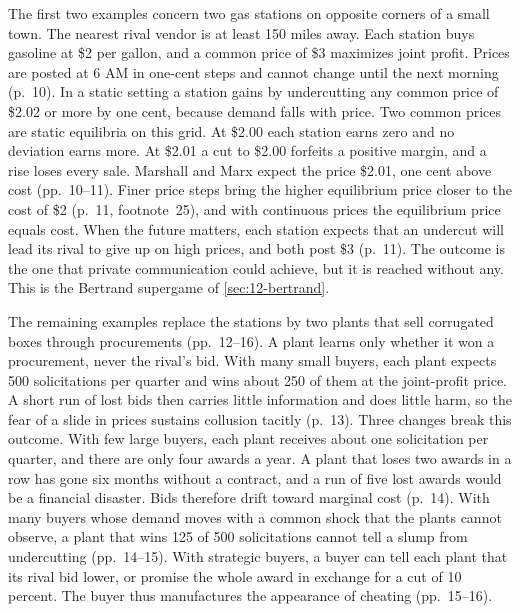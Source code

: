 The first two examples concern two gas stations on opposite corners of a small town. The nearest rival vendor is at least
150 miles away. Each station buys gasoline at \$2 per gallon, and a common price of \$3 maximizes joint profit. Prices are
posted at 6 AM in one-cent steps and cannot change until the next morning (p.~10). In a static setting a station
gains by undercutting any common price of \$2.02 or more by one cent, because demand falls with price. Two common
prices are static equilibria on this grid. At \$2.00 each station earns zero and no deviation earns more. At \$2.01 a
cut to \$2.00 forfeits a positive margin, and a rise loses every sale. Marshall and Marx expect the price \$2.01, one
cent above cost (pp.~10--11). Finer price steps bring the higher equilibrium price closer to the cost of \$2 (p.~11,
footnote~25), and with continuous prices the equilibrium price equals cost. When the future matters, each station
expects that an undercut will lead its rival to give up on high prices, and both post \$3 (p.~11). The outcome is the
one that private communication could achieve, but it is reached without any. This is the Bertrand supergame of
\cref{sec:12-bertrand}.

The remaining examples replace the stations by two plants that sell corrugated boxes through procurements
(pp.~12--16). A plant learns only whether it won a procurement, never the rival's bid. With many small buyers, each
plant expects 500 solicitations per quarter and wins about 250 of them at the joint-profit price. A short run of lost
bids then carries little information and does little harm, so the fear of a slide in prices sustains collusion
tacitly (p.~13). Three changes break this outcome. With few large buyers, each plant receives about one solicitation
per quarter, and there are only four awards a year. A plant that loses two awards in a row has gone six months
without a contract, and a run of five lost awards would be a financial disaster. Bids therefore drift toward marginal
cost (p.~14). With many buyers whose demand moves with a common shock that the plants cannot observe, a plant that
wins 125 of 500 solicitations cannot tell a slump from undercutting (pp.~14--15). With strategic buyers, a buyer can
tell each plant that its rival bid lower, or promise the whole award in exchange for a cut of 10 percent. The buyer
thus manufactures the appearance of cheating (pp.~15--16).

